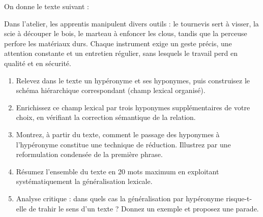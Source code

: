 \documentclass[11pt]{article}
\begin{document}
\begin{exercice}
On donne le texte suivant :

\og Dans l'atelier, les apprentis manipulent divers outils : le tournevis sert à visser, la scie à découper le bois, le marteau à enfoncer les clous, tandis que la perceuse perfore les matériaux durs. Chaque instrument exige un geste précis, une attention constante et un entretien régulier, sans lesquels le travail perd en qualité et en sécurité. \fg

\begin{enumerate}
\item Relevez dans le texte un hypéronyme et ses hyponymes, puis construisez le schéma hiérarchique correspondant (champ lexical organisé).
\item Enrichissez ce champ lexical par trois hyponymes supplémentaires de votre choix, en vérifiant la correction sémantique de la relation.
\item Montrez, à partir du texte, comment le passage des hyponymes à l'hypéronyme constitue une technique de réduction. Illustrez par une reformulation condensée de la première phrase.
\item Résumez l'ensemble du texte en 20 mots maximum en exploitant systématiquement la généralisation lexicale.
\item Analyse critique : dans quels cas la généralisation par hypéronyme risque-t-elle de trahir le sens d'un texte ? Donnez un exemple et proposez une parade.
\end{enumerate}
\end{exercice}
\end{document}
